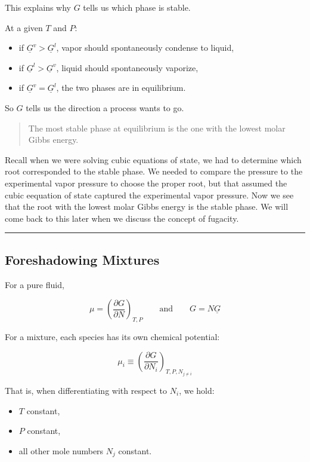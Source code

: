 \documentclass[
  letterpaper,
  DIV=11,
  numbers=noendperiod]{scrartcl}
\providecommand{\tightlist}{%
  \setlength{\itemsep}{0pt}\setlength{\parskip}{0pt}}
\begin{document}
This explains why \(G\) tells us which phase is stable.

At a given \(T\) and \(P\):

\begin{itemize}
\tightlist
\item
  if \(\underline{G}^v > \underline{G}^l\), vapor should spontaneously
  condense to liquid,
\item
  if \(\underline{G}^l > \underline{G}^v\), liquid should spontaneously
  vaporize,
\item
  if \(\underline{G}^v = \underline{G}^l\), the two phases are in
  equilibrium.
\end{itemize}

So \(G\) tells us the direction a process wants to go.

\begin{quote}
The most stable phase at equilibrium is the one with the lowest molar
Gibbs energy.
\end{quote}

Recall when we were solving cubic equations of state, we had to
determine which root corresponded to the stable phase. We needed to
compare the pressure to the experimental vapor pressure to choose the
proper root, but that assumed the cubic eequation of state captured the
experimental vapor pressure. Now we see that the root with the lowest
molar Gibbs energy is the stable phase. We will come back to this later
when we discuss the concept of fugacity.

\begin{center}\rule{0.5\linewidth}{0.5pt}\end{center}

\subsection{Foreshadowing Mixtures}\label{foreshadowing-mixtures}

For a pure fluid,

\[
\mu = \left(\frac{\partial G}{\partial N}\right)_{T,P}
\qquad \text{and} \qquad
G = N\underline{G}
\]

For a mixture, each species has its own chemical potential:

\[
\mu_i \equiv \left(\frac{\partial G}{\partial N_i}\right)_{T,P,N_{j\ne i}}
\]

That is, when differentiating with respect to \(N_i\), we hold:

\begin{itemize}
\tightlist
\item
  \(T\) constant,
\item
  \(P\) constant,
\item
  all other mole numbers \(N_j\) constant.
\end{itemize}
\end{document}
